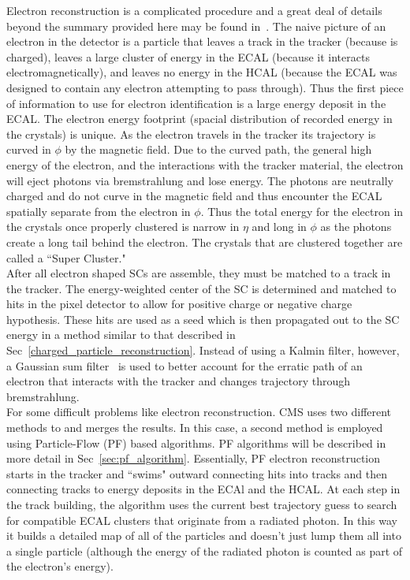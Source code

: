 	Electron reconstruction is a complicated procedure and a great deal of details beyond the summary provided here may be found in~\cite{baffiReco,egmReco,egm201}. The naive picture of an electron in the detector is a particle that leaves a track in the tracker (because is charged), leaves a large cluster of energy in the ECAL (because it interacts electromagnetically), and leaves no energy in the HCAL (because the ECAL was designed to contain any electron attempting to pass through). Thus the first piece of information to use for electron identification is a large energy deposit in the ECAL. The electron energy footprint (spacial distribution of recorded energy in the crystals) is unique. As the electron travels in the tracker its trajectory is curved in $\phi$ by the magnetic field. Due to the curved path, the general high energy of the electron, and the interactions with the tracker material, the electron will eject photons via bremstrahlung and lose energy. The photons are neutrally charged and do not curve in the magnetic field and thus encounter the ECAL spatially separate from the electron in $\phi$. Thus the total energy for the electron in the crystals once properly clustered is narrow in $\eta$ and long in $\phi$ as the photons create a long tail behind the electron. The crystals that are clustered together are called a ``Super Cluster."\\
	
	After all electron shaped SCs are assemble, they must be matched to a track in the tracker. The energy-weighted center of the SC is determined and matched to hits in the pixel detector to allow for positive charge or negative charge hypothesis. These hits are used as a seed which is then propagated out to the SC energy in a method similar to that described in  Sec~\ref{charged_particle_reconstruction}. Instead of using a Kalmin filter, however, a Gaussian sum filter~\cite{gsf} is used to better account for the erratic path of an electron that interacts with the tracker and changes trajectory through bremstrahlung.\\
	
	For some difficult problems like electron reconstruction. CMS uses two different methods to and merges the results. In this case, a second method is employed using Particle-Flow (PF) based algorithms. PF algorithms will be described in more detail in Sec~\ref{sec:pf_algorithm}. Essentially, PF electron reconstruction starts in the tracker and ``swims" outward connecting hits into tracks and then connecting tracks to energy deposits in the ECAl and the HCAL. At each step in the track building, the algorithm uses the current best trajectory guess to search for compatible ECAL clusters that originate from a radiated photon. In this way it builds a detailed map of all of the particles and doesn't just lump them all into a single particle (although the energy of the radiated photon is counted as part of the electron's energy).\\
	
